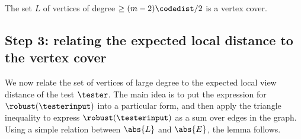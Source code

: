 \documentclass{toc}
\theoremstyle{plain}
\begin{document}
\begin{corollary}\label{cor:vc}
The set $L$ of vertices %
of   %
degree $\geq (m-2)\codedist/2$ is a vertex cover.
\end{corollary}

%
%
\subsection{Step 3: relating the expected local distance to the vertex cover}

We now relate the set of vertices of large degree to the expected local view distance of the test $\tester$. The main idea is to put the expression for $\robust(\testerinput)$ into a particular form, and then apply the triangle inequality to express $\robust(\testerinput)$ as a sum over edges in the graph. Using a simple relation between $\abs{L}$ and $\abs{E}$, the lemma follows.
\end{document}

